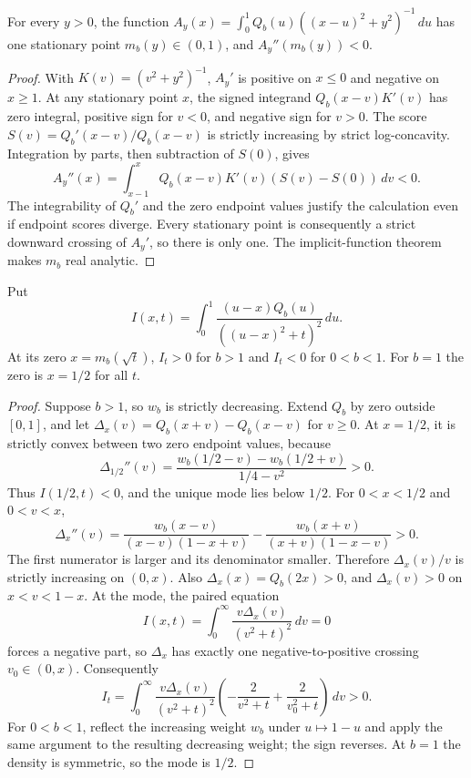 \begin{lemma}
\label{lone:lem:mode}
For every $y>0$, the function
$A_y(x)=\int_0^1Q_b(u)((x-u)^2+y^2)^{-1}\,du$ has one stationary point
$m_b(y)\in(0,1)$, and $A_y''(m_b(y))<0$.
\end{lemma}
\begin{proof}
With $K(v)=(v^2+y^2)^{-1}$, $A_y'$ is positive on $x\le0$ and
negative on $x\ge1$. At any stationary point $x$, the signed integrand
$Q_b(x-v)K'(v)$ has zero integral, positive sign for $v<0$, and
negative sign for $v>0$. The score
$S(v)=Q_b'(x-v)/Q_b(x-v)$ is strictly increasing by strict
log-concavity. Integration by parts, then subtraction of $S(0)$, gives
\[
 A_y''(x)=\int_{x-1}^x Q_b(x-v)K'(v)(S(v)-S(0))\,dv<0.
\]
The integrability of $Q_b'$ and the zero endpoint values justify the
calculation even if endpoint scores diverge. Every stationary point
is consequently a strict downward crossing of $A_y'$, so there is
only one. The implicit-function theorem makes $m_b$ real analytic.
\end{proof}

\begin{lemma}
\label{lone:lem:reflection}
Put
\[
 I(x,t)=\int_0^1\frac{(u-x)Q_b(u)}{((u-x)^2+t)^2}\,du.
\]
At its zero $x=m_b(\sqrt t)$, $I_t>0$ for $b>1$ and $I_t<0$ for
$0<b<1$. For $b=1$ the zero is $x=1/2$ for all $t$.
\end{lemma}
\begin{proof}
Suppose $b>1$, so $w_b$ is strictly decreasing. Extend $Q_b$ by zero
outside $[0,1]$, and let $\Delta_x(v)=Q_b(x+v)-Q_b(x-v)$ for $v\ge0$.
At $x=1/2$, it is strictly convex between two zero endpoint values,
because
\[
 \Delta_{1/2}''(v)=
 \frac{w_b(1/2-v)-w_b(1/2+v)}{1/4-v^2}>0.
\]
Thus $I(1/2,t)<0$, and the unique mode lies below $1/2$.
For $0<x<1/2$ and $0<v<x$,
\[
 \Delta_x''(v)=
 \frac{w_b(x-v)}{(x-v)(1-x+v)}
 -\frac{w_b(x+v)}{(x+v)(1-x-v)}>0.
\]
The first numerator is larger and its denominator smaller. Therefore
$\Delta_x(v)/v$ is strictly increasing on $(0,x)$. Also
$\Delta_x(x)=Q_b(2x)>0$, and $\Delta_x(v)>0$ on $x<v<1-x$.
At the mode, the paired equation
\[
 I(x,t)=\int_0^\infty\frac{v\Delta_x(v)}{(v^2+t)^2}\,dv=0
\]
forces a negative part, so $\Delta_x$ has exactly one
negative-to-positive crossing $v_0\in(0,x)$. Consequently
\[
 I_t=\int_0^\infty\frac{v\Delta_x(v)}{(v^2+t)^2}
       \left(-\frac2{v^2+t}+\frac2{v_0^2+t}\right)\,dv>0.
\]
For $0<b<1$, reflect the increasing weight $w_b$ under $u\mapsto1-u$
and apply the same argument to the resulting decreasing weight; the
sign reverses. At $b=1$ the density is symmetric, so the mode is $1/2$.
\end{proof}

